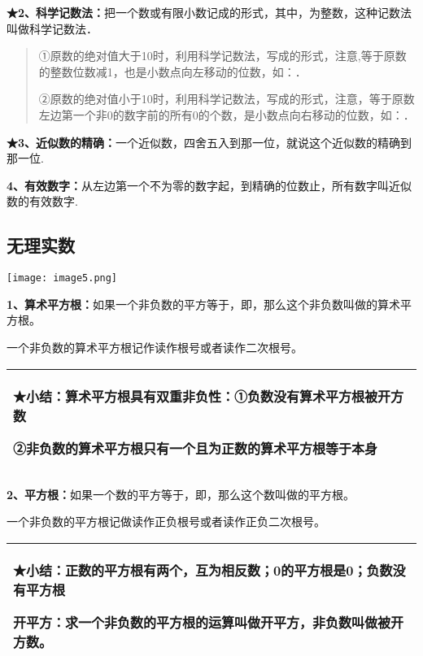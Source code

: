 \textbf{★2、科学记数法：}把一个数或有限小数记成的形式，其中，为整数，这种记数法叫做科学记数法．

\begin{quote}
①原数的绝对值大于10时，利用科学记数法，写成的形式，注意,等于原数的整数位数减1，也是小数点向左移动的位数，如：．

②原数的绝对值小于10时，利用科学记数法，写成的形式，注意，等于原数左边第一个非0的数字前的所有0的个数，是小数点向右移动的位数，如：．
\end{quote}

\textbf{★3、近似数的精确：}一个近似数，四舍五入到那一位，就说这个近似数的精确到那一位.

\textbf{4、有效数字：}从左边第一个不为零的数字起，到精确的位数止，所有数字叫近似数的有效数字.

\hypertarget{ux65e0ux7406ux5b9eux6570}{%
\subsection{\texorpdfstring{
无理实数}{ 无理实数}}\label{ux65e0ux7406ux5b9eux6570}}

\texttt{[image: image5.png]}

\textbf{1、算术平方根：}如果一个非负数的平方等于，即，那么这个非负数叫做的算术平方根。

一个非负数的算术平方根记作读作根号或者读作二次根号。

\begin{longtable}[]{@{}l@{}}
\toprule
\endhead
\begin{minipage}[t]{0.97\columnwidth}\raggedright
★小结：算术平方根具有双重非负性：①负数没有算术平方根被开方数

②非负数的算术平方根只有一个且为正数的算术平方根等于本身\strut
\end{minipage}\tabularnewline
\bottomrule
\end{longtable}

\textbf{2、平方根：}如果一个数的平方等于，即，那么这个数叫做的平方根。

一个非负数的平方根记做读作正负根号或者读作正负二次根号。

\begin{longtable}[]{@{}l@{}}
\toprule
\endhead
\begin{minipage}[t]{0.97\columnwidth}\raggedright
★小结：正数的平方根有两个，互为相反数；0的平方根是0；负数没有平方根

开平方：求一个非负数的平方根的运算叫做开平方，非负数叫做被开方数。\strut
\end{minipage}\tabularnewline
\bottomrule
\end{longtable}

